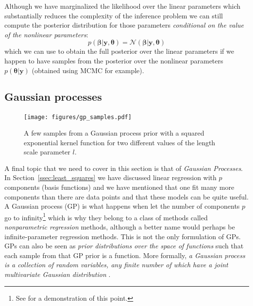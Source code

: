 \documentclass[12pt,dvipsnames]{report}
\renewcommand{\vec}[1]{\boldsymbol{\mathbf{#1}}}
\begin{document}
Although we have marginalized the likelihood over the linear parameters which
substantially reduces the complexity of the inference problem we can still
compute the posterior distribution for those parameters \emph{conditional on
    the value of the nonlinear parameters}:
\begin{equation}
    p(\vec\beta\lvert \vec{y}, \vec{\theta})=\mathcal{N}(\vec\beta\lvert \vec{y}, \vec{\theta})
\end{equation}
which we can use to obtain the full posterior over the linear parameters if we happen
to have samples from the posterior over the nonlinear parameters $p(\vec{\theta}|\vec{y})$
(obtained using MCMC for example).

\subsection{Gaussian processes}
\begin{figure}[t]
    \begin{centering}
        \texttt{[image: figures/gp\_samples.pdf]}
        \caption{A few samples from a Gaussian process prior with a squared exponential
            kernel function for two different values of the length scale parameter $l$.}
        \label{fig:gp_samples}
    \end{centering}
\end{figure}
A final topic that we need to cover in this section is that of \textsl{Gaussian
    Processes}. In Section~\ref{ssec:least_squares} we have discussed linear
regression with $p$ components (basis functions) and we have mentioned that one
fit many more components than there are data points and that these models can
be quite useful. A Gaussian process (GP) is what happens when let the number of
components $p$ go to infinity\footnote{See \citet{arXiv:2101.07256} for a
    demonstration of this point.} which is why they belong to a class of methods
called \textsl{nonparametric regression} methods, although a better name would
perhaps be infinite-parameter regression methods. This is not the only
formulation of GPs. GPs can also be seen as \emph{prior distributions over the
    space of functions} such that each sample from that GP prior is a function.
More formally, \emph{a Gaussian process is a collection of random variables,
    any finite number of which have a joint multivariate Gaussian
    distribution} \citep{rasmussen2006}.
\end{document}
